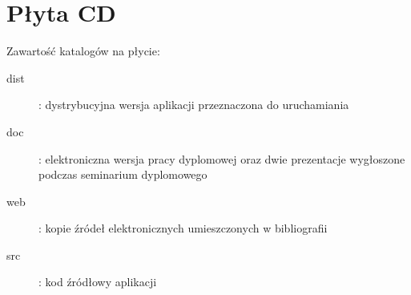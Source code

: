 \chapter{Płyta CD}\label{app:plyta}

\begin{figure}[htb]
\makebox[\textwidth]{\framebox[12.8cm]{\rule{0pt}{12.8cm}}}
\end{figure}
\pagebreak

Zawartość katalogów na płycie:
\begin{description}
    \item[dist] : dystrybucyjna wersja aplikacji przeznaczona do uruchamiania 
    \item[doc] : elektroniczna wersja pracy dyplomowej oraz dwie prezentacje wygłoszone podczas seminarium dyplomowego 
    \item[web] : kopie źródeł elektronicznych umieszczonych w bibliografii
    \item[src] : kod źródłowy aplikacji 
\end{description}

